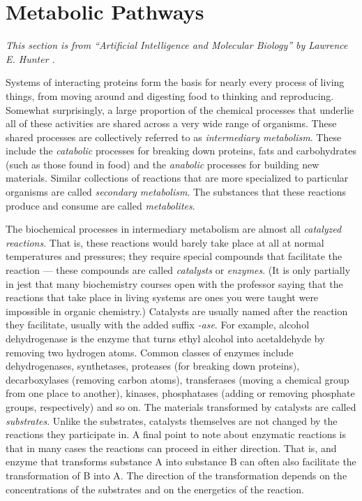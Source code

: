 \section{Metabolic Pathways}
\label{sect:metabolic_pathways}

\emph{This section is from ``Artificial Intelligence and Molecular Biology'' by
Lawrence E. Hunter \cite{mb-for-cs}.}

Systems of interacting proteins form the basis for nearly every process of
living things, from moving around and digesting food to thinking and
reproducing. Somewhat surprisingly, a large proportion of the chemical processes
that underlie all of these activities are shared across a very wide range of
organisms. These shared processes are collectively referred to as
\emph{intermediary metabolism}. These include the \emph{catabolic} processes for
breaking down proteins, fats and carbohydrates (such as those found in food) and
the \emph{anabolic} processes for building new materials. Similar collections of
reactions that are more specialized to particular organisms are called
\emph{secondary metabolism}. The substances that these reactions produce and
consume are called \emph{metabolites}.

The biochemical processes in intermediary metabolism are almost all
\emph{catalyzed reactions}. That is, these reactions would barely take place at
all at normal temperatures and pressures; they require special compounds that
facilitate the reaction --- these compounds are called \emph{catalysts} or
\emph{enzymes}. (It is only partially in jest that many biochemistry courses
open with the professor saying that the reactions that take place in living
systems are ones you were taught were impossible in organic chemistry.)
Catalysts are usually named after the reaction they facilitate, usually with the
added suffix \emph{-ase}. For example, alcohol dehydrogenase is the enzyme that
turns ethyl alcohol into acetaldehyde by removing two hydrogen atoms. Common
classes of enzymes include dehydrogenases, synthetases, proteases (for breaking
down proteins), decarboxylases (removing carbon atoms), transferases (moving a
chemical group from one place to another), kinases, phosphatases (adding or
removing phosphate groups, respectively) and so on. The materials transformed by
catalysts are called \emph{substrates}. Unlike the substrates, catalysts
themselves are not changed by the reactions they participate in. A final point
to note about enzymatic reactions is that in many cases the reactions can
proceed in either direction. That is, and enzyme that transforms substance A
into substance B can often also facilitate the transformation of B into A. The
direction of the transformation depends on the concentrations of the substrates
and on the energetics of the reaction.

